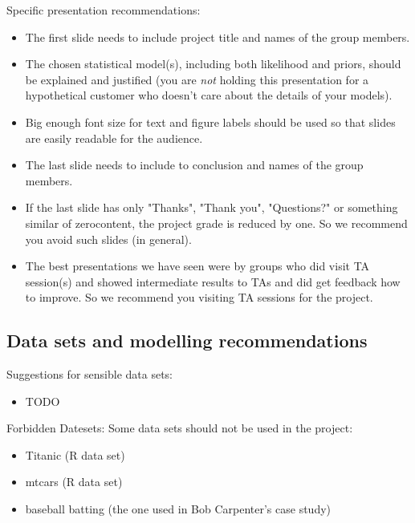 \documentclass[a4paper,11pt]{article}
\begin{document}
Specific presentation recommendations:
\begin{itemize}
  \item The first slide needs to include project title and names of the group members.
  \item The chosen statistical model(s), including both likelihood and priors, should be explained and justified (you are \textit{not} holding this presentation for a hypothetical customer who doesn't care about the details of your models).
  \item Big enough font size for text and figure labels should be used so that slides are easily readable for the audience.
  \item The last slide needs to include to conclusion and names of the group members. 
  \item If the last slide has only "Thanks", "Thank you", "Questions?" or something similar of zerocontent, the project grade is reduced by one. So we recommend you avoid such slides (in general).
  \item The best presentations we have seen were by groups who did visit TA session(s) and showed intermediate results to TAs and did get feedback how to improve. So we recommend you visiting TA sessions for the project.
\end{itemize}

\subsection*{Data sets and modelling recommendations}

Suggestions for sensible data sets:

\begin{itemize}
\item TODO
\end{itemize}

Forbidden Datesets: Some data sets should not be used in the project:

\begin{itemize}
\item Titanic (R data set)
\item mtcars (R data set)
\item baseball batting (the one used in Bob Carpenter's case study)
\end{itemize}
\end{document}
